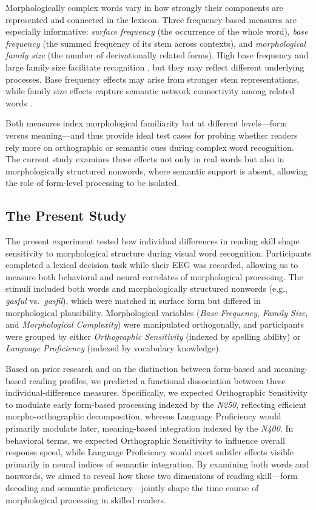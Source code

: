 Morphologically complex words vary in how strongly their components are represented and connected in the lexicon. Three frequency-based measures are especially informative: \textit{surface frequency} (the occurrence of the whole word), \textit{base frequency} (the summed frequency of its stem across contexts), and \textit{morphological family size} (the number of derivationally related forms). High base frequency and large family size facilitate recognition \citep{taftRecognitionAffixedWords1979, schreuderMorphologicalFamilySize1997}, but they may reflect different underlying processes. Base frequency effects may arise from stronger stem representations, while family size effects capture semantic network connectivity among related words \citep{vannestCoActivationMorphologicalFamilies2011}. 

Both measures index morphological familiarity but at different levels—form versus meaning—and thus provide ideal test cases for probing whether readers rely more on orthographic or semantic cues during complex word recognition. The current study examines these effects not only in real words but also in morphologically structured nonwords, where semantic support is absent, allowing the role of form-level processing to be isolated.

\subsection{The Present Study}

The present experiment tested how individual differences in reading skill shape sensitivity to morphological structure during visual word recognition. Participants completed a lexical decision task while their EEG was recorded, allowing us to measure both behavioral and neural correlates of morphological processing. The stimuli included both words and morphologically structured nonwords (e.g., \textit{gasful} vs.~\textit{gasfil}), which were matched in surface form but differed in morphological plausibility. Morphological variables (\textit{Base Frequency}, \textit{Family Size}, and \textit{Morphological Complexity}) were manipulated orthogonally, and participants were grouped by either \textit{Orthographic Sensitivity} (indexed by spelling ability) or \textit{Language Proficiency} (indexed by vocabulary knowledge).

Based on prior research and on the distinction between form-based and meaning-based reading profiles, we predicted a functional dissociation between these individual-difference measures. Specifically, we expected Orthographic Sensitivity to modulate early form-based processing indexed by the \textit{N250}, reflecting efficient morpho-orthographic decomposition, whereas Language Proficiency would primarily modulate later, meaning-based integration indexed by the \textit{N400}. In behavioral terms, we expected Orthographic Sensitivity to influence overall response speed, while Language Proficiency would exert subtler effects visible primarily in neural indices of semantic integration. By examining both words and nonwords, we aimed to reveal how these two dimensions of reading skill—form decoding and semantic proficiency—jointly shape the time course of morphological processing in skilled readers.

